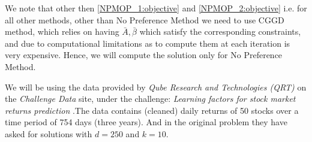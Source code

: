 We note that other then \ref{NPMOP_1:objective} and \ref{NPMOP_2:objective} i.e. for all other methods, other than No Preference Method we need to use CGGD method, which relies on having $\bar{A}, \bar{\beta}$ which satisfy the corresponding constraints, and due to computational limitations as to compute them at each iteration is very expensive. Hence, we will compute the solution only for No Preference Method.

\newpage
{}
We will be using the data provided by \textit{Qube Research and Technologies (QRT)} on the \textit{Challenge Data} site, under the challenge: \textit{Learning factors for stock market returns prediction} \cite{qrt_challenge}.\newline The data contains (cleaned) daily returns of 50 stocks over a time period of 754 days (three years). And in the original problem they have asked for solutions with $d=250$ and $k=10$.


